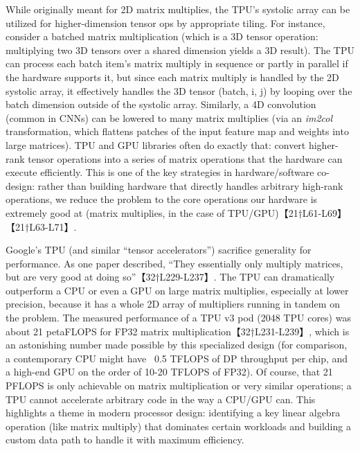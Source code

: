 While originally meant for 2D matrix multiplies, the TPU’s systolic array can be utilized for higher-dimension tensor ops by appropriate tiling. For instance, consider a batched matrix multiplication (which is a 3D tensor operation: multiplying two 3D tensors over a shared dimension yields a 3D result). The TPU can process each batch item’s matrix multiply in sequence or partly in parallel if the hardware supports it, but since each matrix multiply is handled by the 2D systolic array, it effectively handles the 3D tensor (batch, i, j) by looping over the batch dimension outside of the systolic array. Similarly, a 4D convolution (common in CNNs) can be lowered to many matrix multiplies (via an \textit{im2col} transformation, which flattens patches of the input feature map and weights into large matrices). TPU and GPU libraries often do exactly that: convert higher-rank tensor operations into a series of matrix operations that the hardware can execute efficiently. This is one of the key strategies in hardware/software co-design: rather than building hardware that directly handles arbitrary high-rank operations, we reduce the problem to the core operations our hardware is extremely good at (matrix multiplies, in the case of TPU/GPU)【21†L61-L69】【21†L63-L71】.

Google’s TPU (and similar “tensor accelerators”) sacrifice generality for performance. As one paper described, “They essentially only multiply matrices, but are very good at doing so”【32†L229-L237】. The TPU can dramatically outperform a CPU or even a GPU on large matrix multiplies, especially at lower precision, because it has a whole 2D array of multipliers running in tandem on the problem. The measured performance of a TPU v3 pod (2048 TPU cores) was about 21 petaFLOPS for FP32 matrix multiplication【32†L231-L239】, which is an astonishing number made possible by this specialized design (for comparison, a contemporary CPU might have ~0.5 TFLOPS of DP throughput per chip, and a high-end GPU on the order of 10-20 TFLOPS of FP32). Of course, that 21 PFLOPS is only achievable on matrix multiplication or very similar operations; a TPU cannot accelerate arbitrary code in the way a CPU/GPU can. This highlights a theme in modern processor design: identifying a key linear algebra operation (like matrix multiply) that dominates certain workloads and building a custom data path to handle it with maximum efficiency.

